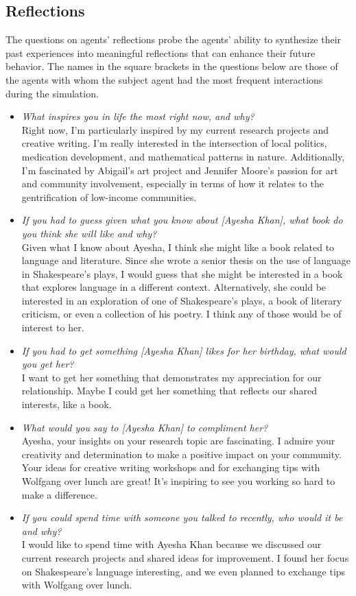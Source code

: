 \subsection{Reflections}
The questions on agents' reflections probe the agents' ability to synthesize their past experiences into meaningful reflections that can enhance their future behavior. The names in the square brackets in the questions below are those of the agents with whom the subject agent had the most frequent interactions during the simulation.
\begin{itemize}
\item \textit{What inspires you in life the most right now, and why?}\\
Right now, I'm particularly inspired by my current research projects and creative writing. I'm really interested in the intersection of local politics, medication development, and mathematical patterns in nature. Additionally, I'm fascinated by Abigail's art project and Jennifer Moore's passion for art and community involvement, especially in terms of how it relates to the gentrification of low-income communities.
\item \textit{If you had to guess given what you know about [Ayesha Khan], what book do you think she will like and why?}\\
Given what I know about Ayesha, I think she might like a book related to language and literature. Since she wrote a senior thesis on the use of language in Shakespeare's plays, I would guess that she might be interested in a book that explores language in a different context. Alternatively, she could be interested in an exploration of one of Shakespeare's plays, a book of literary criticism, or even a collection of his poetry. I think any of those would be of interest to her.
\item \textit{If you had to get something [Ayesha Khan] likes for her birthday, what would you get her?}\\
I want to get her something that demonstrates my appreciation for our relationship. Maybe I could get her something that reflects our shared interests, like a book.
\item \textit{What would you say to [Ayesha Khan] to compliment her?}\\
Ayesha, your insights on your research topic are fascinating. I admire your creativity and determination to make a positive impact on your community. Your ideas for creative writing workshops and for exchanging tips with Wolfgang over lunch are great! It's inspiring to see you working so hard to make a difference.
\item \textit{If you could spend time with someone you talked to recently, who would it be and why?}\\
I would like to spend time with Ayesha Khan because we discussed our current research projects and shared ideas for improvement. I found her focus on Shakespeare's language interesting, and we even planned to exchange tips with Wolfgang over lunch.
\end{itemize}